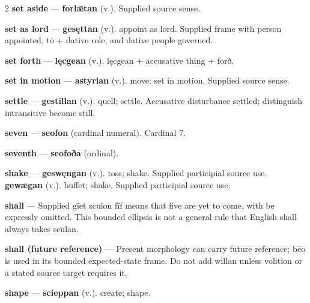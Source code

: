 \begin{multicols}{2}
\textbf{set aside} — \textbf{forlǣtan} (v.). Supplied source sense.\par
\textbf{set as lord} — \textbf{gesęttan} (v.). appoint as lord. Supplied frame with person appointed, tō + dative role, and dative people governed.\par
\textbf{set forth} — \textbf{lęcgean} (v.). lęcgean + accusative thing + forð.\par
\textbf{set in motion} — \textbf{astyrian} (v.). move; set in motion. Supplied source sense.\par
\textbf{settle} — \textbf{gestillan} (v.). quell; settle. Accusative disturbance settled; distinguish intransitive become still.\par
\textbf{seven} — \textbf{seofon} (cardinal numeral). Cardinal 7.\par
\textbf{seventh} — \textbf{seofoða} (ordinal).\par
\textbf{shake} — \textbf{geswęngan} (v.). toss; shake. Supplied participial source use. \textbf{gewǣgan} (v.). buffet; shake. Supplied participial source use.\par
\textbf{shall} — Supplied gīet sculon fīf means that five are yet to come, with be expressly omitted. This bounded ellipsis is not a general rule that English shall always takes sculan.\par
\textbf{shall (future reference)} — Present morphology can carry future reference; bēo is used in its bounded expected-state frame. Do not add willan unless volition or a stated source target requires it.\par
\textbf{shape} — \textbf{scieppan} (v.). create; shape.\par

\end{multicols}
